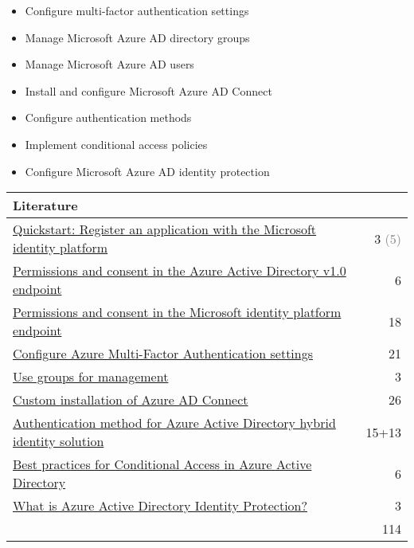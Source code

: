 \begin{itemize}
\item Configure multi-factor authentication settings 
\item Manage Microsoft Azure AD directory groups 
\item Manage Microsoft Azure AD users 
\item Install and configure Microsoft Azure AD Connect 
\item Configure authentication methods 
\item Implement conditional access policies 
\item Configure Microsoft Azure AD identity protection 
\end{itemize}

\begin{tabular}{p{14cm} | r}
\textbf{Literature} & \\
\hline
\href{https://docs.microsoft.com/en-us/azure/active-directory/develop/quickstart-register-app}{Quickstart: Register an application with the Microsoft identity platform} & 3 \textcolor{gray}{(5)} \\
\href{https://docs.microsoft.com/en-us/azure/active-directory/develop/v1-permissions-and-consent}{Permissions and consent in the Azure Active Directory v1.0 endpoint} & 6 \\
\href{https://docs.microsoft.com/en-us/azure/active-directory/develop/v2-permissions-and-consent}{Permissions and consent in the Microsoft identity platform endpoint} & 18 \\
\href{https://docs.microsoft.com/en-us/azure/active-directory/authentication/howto-mfa-mfasettings}{Configure Azure Multi-Factor Authentication settings} & 21 \\
\href{https://docs.microsoft.com/en-us/microsoft-365/enterprise/identity-use-group-management}{Use groups for management} & 3 \\
\href{https://docs.microsoft.com/en-us/azure/active-directory/hybrid/how-to-connect-install-custom}{Custom installation of Azure AD Connect} & 26 \\
\href{https://docs.microsoft.com/en-us/azure/security/fundamentals/choose-ad-authn}{Authentication method for Azure Active Directory hybrid identity solution} & 15+13 \\
\href{https://docs.microsoft.com/en-us/azure/active-directory/conditional-access/best-practices}{Best practices for Conditional Access in Azure Active Directory} & 6 \\
\href{https://docs.microsoft.com/en-us/azure/active-directory/identity-protection/overview-identity-protection}{What is Azure Active Directory Identity Protection?} & 3 \\
\cline{2-2} 
 & 114
\end{tabular}

